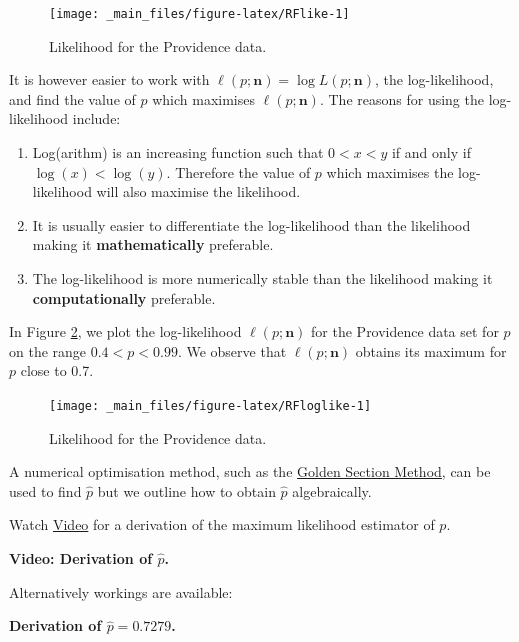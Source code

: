\documentclass[
]{book}
\providecommand{\tightlist}{%
  \setlength{\itemsep}{0pt}\setlength{\parskip}{0pt}}
\begin{document}
\begin{figure}
\texttt{[image: \_main\_files/figure-latex/RFlike-1]} \caption{Likelihood for the Providence data.}\label{fig:RFlike}
\end{figure}

It is however easier to work with \(\ell (p; \mathbf{n}) = \log L (p; \mathbf{n})\), the log-likelihood, and find the value of \(p\) which maximises \(\ell (p; \mathbf{n})\). The reasons for using the log-likelihood include:

\begin{enumerate}
\def\labelenumi{\arabic{enumi}.}
\tightlist
\item
  Log(arithm) is an increasing function such that \(0< x <y\) if and only if \(\log (x) < \log (y)\). Therefore the value of \(p\) which maximises the log-likelihood will also maximise the likelihood.\\
\item
  It is usually easier to differentiate the log-likelihood than the likelihood making it {\textbf{mathematically}} preferable.\\
\item
  The log-likelihood is more numerically stable than the likelihood making it {\textbf{computationally}} preferable.
\end{enumerate}

In Figure \ref{fig:RFloglike}, we plot the log-likelihood \(\ell (p; \mathbf{n})\) for the Providence data set for \(p\) on the range \(0.4 < p < 0.99\). We observe that \(\ell (p; \mathbf{n})\) obtains its maximum for \(p\) close to 0.7.

\begin{figure}
\texttt{[image: \_main\_files/figure-latex/RFloglike-1]} \caption{Likelihood for the Providence data.}\label{fig:RFloglike}
\end{figure}

A numerical optimisation method, such as the \href{https://en.wikipedia.org/wiki/Golden-section_search}{Golden Section Method}, can be used to find \(\hat{p}\) but we outline how to obtain \(\hat{p}\) algebraically.

Watch \protect\hyperlink{video}{Video} for a derivation of the maximum likelihood estimator of \(p\).

\leavevmode{}%
{\textbf{Video: Derivation of \(\hat{p}\).}}

Alternatively workings are available:

\textbf{Derivation of \(\hat{p} =0.7279\).}
\end{document}
